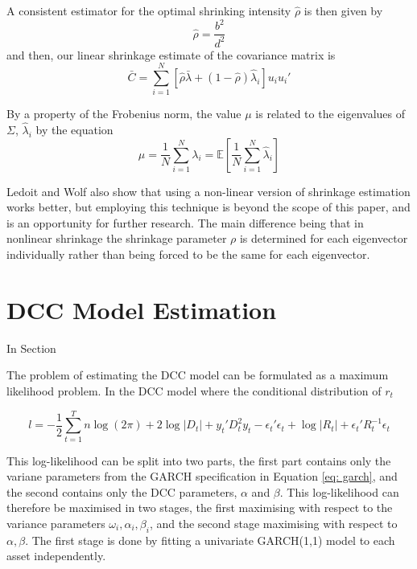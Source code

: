 \documentclass{article} %
\numberwithin{equation}{section} %
\numberwithin{figure}{section} %
\numberwithin{table}{section} %
\begin{document}
A consistent estimator for the optimal shrinking intensity $\hat{\rho}$ is then given by
\begin{equation}\label{rho hat}
\hat{\rho} = \frac{b^2}{d^2}
\end{equation}
and then, our linear shrinkage estimate of the covariance matrix is
\begin{equation}
\bar{C} = \sum\limits_{i = 1}^{N}\left[ \hat{\rho}\bar{\lambda} + (1 - \hat{\rho}) \hat{\lambda}_i \right] u_i u_i'
\end{equation}


By a property of the Frobenius norm, the value $\mu$ is related to the eigenvalues of $\Sigma$, $\hat{\lambda}_i$ by the equation
\begin{equation}
\mu = \frac{1}{N} \sum\limits_{i=1}^{N} \lambda_i = \mathbb{E} \left[ \frac{1}{N} \sum\limits_{i=1}^{N} \hat{\lambda}_i \right]
\end{equation}

Ledoit and Wolf also show \cite{non-linear shrinkage} that using a non-linear version of shrinkage estimation works better, but employing this technique is beyond the scope of this paper, and is an opportunity for further research. The main difference being that in nonlinear shrinkage the shrinkage parameter $\rho$ is determined for each eigenvector individually rather than being forced to be the same for each eigenvector.


\section{DCC Model Estimation}\label{section: dcc estimation}

In Section

The problem of estimating the DCC model can be formulated as a maximum likelihood problem. In the DCC model where the conditional distribution of $r_t$

\begin{equation}\label{eq: loglik}
l = - \frac{1}{2} \sum\limits_{t=1}^T n \log(2\pi) + 2 \log |D_t| + y_t' D_t^2y_t - \epsilon_t' \epsilon_t + \log |R_t| + \epsilon_t'R_t^{-1}\epsilon_t
\end{equation}

This log-likelihood can be split into two parts, the first part contains only the variane parameters from the GARCH specification in Equation \ref{eq: garch}, and the second contains only the DCC parameters, $\alpha$ and $\beta$. This log-likelihood can therefore be maximised in two stages, the first maximising with respect to the variance parameters $\omega_i, \alpha_i, \beta_i$, and the second stage maximising with respect to $\alpha, \beta$. The first stage is done by fitting a univariate GARCH(1,1) model to each asset independently.
\end{document}
